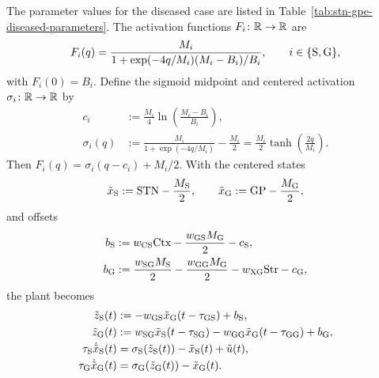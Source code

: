 The parameter values for the diseased case are
listed in Table~\ref{tab:stn-gpe-diseased-parameters}.
The activation functions $F_i\colon\mathbb{R}\to\mathbb{R}$ are
\begin{equation}\label{eq:stn-gpe-uncentered-sigmoid}
F_i(q)=\frac{M_i}{1+\exp(-4q/M_i)(M_i-B_i)/B_i},
\qquad i\in\{{\mathrm{S}},{\mathrm{G}}\},
\end{equation}
with $F_i(0)=B_i$. Define the sigmoid midpoint and centered activation
$\sigma_i\colon\mathbb{R}\to\mathbb{R}$ by
\begin{equation}\label{eq:stn-gpe-centered-sigmoid}
\begin{aligned}
c_i&:=\frac{M_i}{4}\ln\!\left(\frac{M_i-B_i}{B_i}\right),\\
\sigma_i(q)&:=\frac{M_i}{1+\exp(-4q/M_i)}-\frac{M_i}{2}=\frac{M_i}{2}\tanh\!\left(\frac{2q}{M_i}\right).
\end{aligned}
\end{equation}
Then $F_i(q)=\sigma_i(q-c_i)+M_i/2$. With the centered states
\begin{equation*}
\tilde{x}_{{\mathrm{S}}}:={\mathrm{STN}}-\frac{M_{{\mathrm{S}}}}{2},
\qquad
\tilde{x}_{{\mathrm{G}}}:={\mathrm{GP}}-\frac{M_{{\mathrm{G}}}}{2},
\end{equation*}
and offsets
\begin{equation*}
\begin{aligned}
b_{{\mathrm{S}}}&:=w_{{\mathrm{CS}}}{\mathrm{Ctx}}-\frac{w_{{\mathrm{GS}}}M_{{\mathrm{G}}}}{2}-c_{{\mathrm{S}}},\\
b_{{\mathrm{G}}}&:=\frac{w_{{\mathrm{SG}}}M_{{\mathrm{S}}}}{2}-\frac{w_{{\mathrm{GG}}}M_{{\mathrm{G}}}}{2}
      -w_{{\mathrm{XG}}}{\mathrm{Str}}-c_{{\mathrm{G}}},
\end{aligned}
\end{equation*}
the plant becomes
\begin{equation}\label{eq:stn-gpe-centered}
\begin{aligned}
\tilde{z}_{{\mathrm{S}}}(t)&:=-w_{{\mathrm{GS}}}\tilde{x}_{{\mathrm{G}}}(t-\tau_{{\mathrm{GS}}})+b_{{\mathrm{S}}},\\
\tilde{z}_{{\mathrm{G}}}(t)&:=w_{{\mathrm{SG}}}\tilde{x}_{{\mathrm{S}}}(t-\tau_{{\mathrm{SG}}})
          -w_{{\mathrm{GG}}}\tilde{x}_{{\mathrm{G}}}(t-\tau_{{\mathrm{GG}}})+b_{{\mathrm{G}}},\\
\tau_{{\mathrm{S}}}\dot{\tilde{x}}_{{\mathrm{S}}}(t)
      &=\sigma_{{\mathrm{S}}}(\tilde{z}_{{\mathrm{S}}}(t))
        -\tilde{x}_{{\mathrm{S}}}(t)+\tilde{u}(t),\\
\tau_{{\mathrm{G}}}\dot{\tilde{x}}_{{\mathrm{G}}}(t)
      &=\sigma_{{\mathrm{G}}}(\tilde{z}_{{\mathrm{G}}}(t))
        -\tilde{x}_{{\mathrm{G}}}(t).
\end{aligned}
\end{equation}
